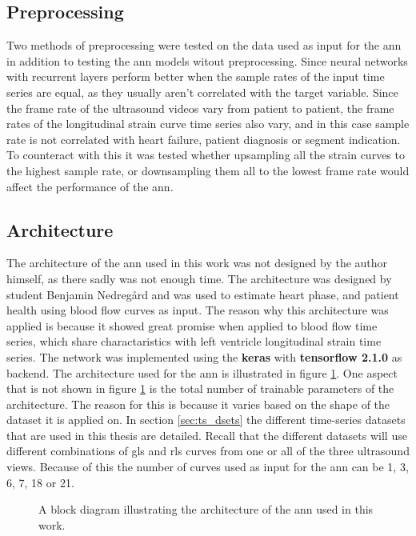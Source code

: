 \subsection{Preprocessing}

Two methods of preprocessing were tested on the data used as input for the \acrshort{ann} in addition to testing the \acrshort{ann} models witout preprocessing. Since neural networks with recurrent layers perform better when the sample rates of the input time series are equal, as they usually aren't correlated with the target variable. Since the frame rate of the ultrasound videos vary from patient to patient, the frame rates of the longitudinal strain curve time series also vary, and in this case sample rate is not correlated with heart failure, patient diagnosis or segment indication. To counteract with this it was tested whether upsampling all the strain curves to the highest sample rate, or downsampling them all to the lowest frame rate would affect the performance of the \acrshort{ann}. 

\subsection{Architecture}

The architecture of the \acrshort{ann} used in this work was not designed by the author himself, as there sadly was not enough time. The architecture was designed by student Benjamin Nedregård and was used to estimate heart phase, and patient health using blood flow curves as input. The reason why this architecture was applied is because it showed great promise when applied to blood flow time series, which share charactaristics with left ventricle longitudinal strain time series. The network was implemented using the \textbf{keras} with \textbf{tensorflow 2.1.0} as backend. The architecture used for the \acrshort{ann} is illustrated in figure \ref{fig:nn_arch}. One aspect that is not shown in figure \ref{fig:nn_arch} is the total number of trainable parameters of the architecture. The reason for this is because it varies based on the shape of the dataset it is applied on. In section \ref{sec:ts_dsets} the different time-series datasets that are used in this thesis are detailed. Recall that the different datasets will use different combinations of \acrshort{gls} and \acrshort{rls} curves from one or all of the three ultrasound views. Because of this the number of curves used as input for the \acrshort{ann} can be 1, 3, 6, 7, 18 or 21.

\begin{figure}
    \centering
    
    \caption{A block diagram illustrating the architecture of the \acrshort{ann} used in this work.}
    \label{fig:nn_arch}
\end{figure}

